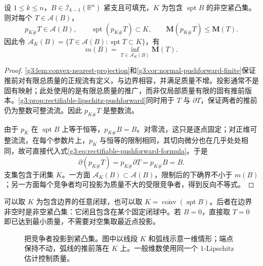 \begin{proposition}\label{g3:prop:plateau-convex-reduction}
	设 \(1\le k\le n\)，\(B\in\mathcal I_{k-1}(\mathbb R^n)\) 紧支且可填充，\(K\) 为包含 \(\operatorname{spt}B\) 的非空紧凸集。则对每个 \(T\in\mathcal A(B)\)，
	\[
		p_{K\#}T\in\mathcal A(B),\qquad
		\operatorname{spt}(p_{K\#}T)\subset K,\qquad
		\mathbf M(p_{K\#}T)\le\mathbf M(T).
	\]
	因此令 \(\mathcal A_K(B)=\{T\in\mathcal A(B):\operatorname{spt}T\subset K\}\)，有
	\begin{equation}\label{g3:eq:plateau-same-infimum}
		m(B)=\inf_{T\in\mathcal A_K(B)}\mathbf M(T).
	\end{equation}
\end{proposition}
\begin{proof}
	\cref{g3:lem:convex-nearest-projection}和\cref{g3:cor:normal-pushforward-finite}保证推前对有限总质量的正规流有定义，与边界相容，并满足质量不增。投影通常不是固有映射；此处使用的是有限总质量的推广，而非仅局部质量有限的固有推前版本。\cref{g3:prop:rectifiable-lipschitz-pushforward}同时用于 \(T\) 与 \(\partial T\)，保证两者的推前仍为整数可整流流。因此 \(p_{K\#}T\) 是整数流。

	由于 \(p_K\) 在 \(\operatorname{spt}B\) 上等于恒等，\(p_{K\#}B=B\)。对零流，这只是逐点固定；对正维可整流流，在每个参数片上，\(p_K\) 与恒等的限制相同，其切向微分也在几乎处处相同，故可直接代入式\eqref{g3:eq:rectifiable-pushforward-formula}。于是
	\[
		\partial(p_{K\#}T)=p_{K\#}\partial T=p_{K\#}B=B.
	\]
	支集包含于闭集 \(K\)。一方面 \(\mathcal A_K(B)\subset\mathcal A(B)\)，限制后的下确界不小于 \(m(B)\)；另一方面每个竞争者均可投影为质量不大的受限竞争者，得到反向不等式。
\end{proof}

可以取 \(K\) 为包含边界的任意闭球，也可以取
\(K=\overline{\operatorname{conv}}(\operatorname{spt}B)\)。后者在边界非空时是非空紧凸集：它闭且包含在某个固定闭球中。若 \(B=0\)，直接取 \(T=0\) 即已达到最小质量，不需要对空集取最近点投影。

\begin{figure}[htbp]
	\centering
	
	\caption[把竞争者投影到紧凸集]{把竞争者投影到紧凸集。图中以线段 \(K\) 和弧线示意一维情形；端点保持不动，弧线的推前落在 \(K\) 上。一般维数使用同一个 \(1\)-Lipschitz 估计控制质量。}
	\label{g3:fig:plateau-convex-projection}
\end{figure}

